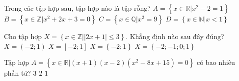 \begin{ex}%
	Trong các tập hợp sau, tập hợp nào là tập rỗng?
	\choice
	{$A = \left\{x \in \mathbb{R}\big| x^2 - 2 = 1\right\}$}
	{\True $B = \left\{x \in \mathbb{Z}\big| x^2 + 2x + 3 = 0\right\}$}
	{$C = \left\{x \in \mathbb{Q}\big| x^2 = 9\right\}$}
	{$D = \left\{x \in \mathbb{N}\big| x < 1\right\}$}
\end{ex}
\begin{ex}%
	Cho tập hợp $X = \left\{x \in \mathbb{Z}\big| \left|2x + 1\right| \le 3\right\}$. Khẳng định nào sau đây đúng?
	\choice
	{$X = \left(-2;1\right)$}
	{$X = \left[-2;1\right]$}
	{$X = \left\{-2;1\right\}$}
	{\True $X = \left\{-2;-1;0;1\right\}$}
\end{ex}
\begin{ex}%
	Tập hợp $A = \left\{x \in \mathbb{R}\big|\left(x + 1\right)\left(x - 2\right)\left(x^2 - 8x + 15\right) = 0\right\}$ có bao nhiêu phần tử?
	{$3$}
	{$2$}
	{$1$}
\end{ex}



